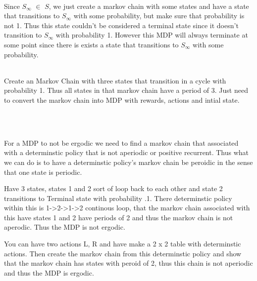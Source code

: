 \documentclass[12pt]{article}
\newenvironment{problem}[2][Problem]{\begin{trivlist}
\item[\hskip \labelsep {\bfseries #1}\hskip \labelsep {\bfseries #2.}]}{\end{trivlist}}
\begin{document}
\begin{problem}{10}
\text{ }\\
Since $S_{\infty}$ $\in$ $S$, we just create a markov chain with some states and have a state that transitions to $S_{\infty}$ with some probability,
but make sure that probability is not 1. Thus this state couldn't be considered a terminal state since it doesn't transition to $S_{\infty}$ with probability
1. However this MDP will always terminate at some point since there is exists a state that transitions to $S_{\infty}$ with some probability.
\end{problem}

\begin{problem}{11}
\text{ }\\
Create an Markov Chain with three states that transition in a cycle with probability 1. Thus all states
in that markov chain have a period of 3. Just need to convert the markov chain into MDP with rewards, actions and intial state.
\end{problem}

\begin{problem}{12}
\text{ }\\
\end{problem}

\begin{problem}{13}
\text{ }\\

For a MDP to not be ergodic we need to find a markov chain that associated with a determinstic policy that is not aperiodic or positive
recurrent. Thus what we can do is to have a determinstic policy's markov chain be peroidic in the sense that one state is periodic.

Have 3 states, states 1 and 2 sort of loop back to each other and state 2 transitions to Terminal state with probability .1. There determinstic policy
within this is 1->2->1->2 continous loop, that the markov chain associated with this have states 1 and 2 have periods of 2 and thus the markov chain is
not aperodic. Thus the MDP is not ergodic.

You can have two actions L, R and have make a 2 x 2 table with determinstic actions. Then create the markov chain from this determinstic policy
and show that the markov chain has states with peroid of 2, thus this chain is not aperiodic and thus the MDP is ergodic.

\end{problem}

\begin{problem}{14}
\text{ }\\
\end{problem}
\end{document}
